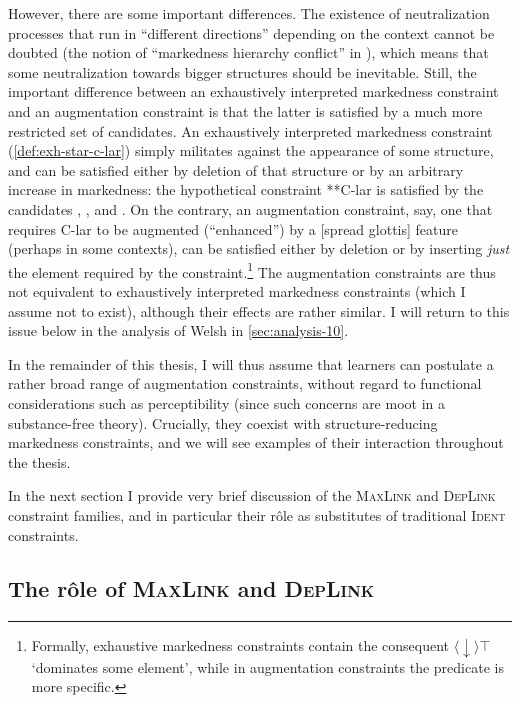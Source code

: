 However, there are some important differences. The existence of neutralization processes that run in \enquote{different directions} depending on the context cannot be doubted (\cf the notion of \enquote{markedness hierarchy conflict} in \citealp{delacy2006}), which means that some neutralization towards bigger structures should be inevitable. Still, the important difference between an exhaustively interpreted markedness constraint and an augmentation constraint is that the latter is satisfied by a much more restricted set of candidates. An exhaustively interpreted markedness constraint (\cref{def:exh-star-c-lar}) simply militates against the appearance of some structure, and can be satisfied either by deletion of that structure or by an arbitrary increase in markedness: the hypothetical constraint **C-lar is satisfied by the candidates \featurestring{\rt}, , and . On the contrary, an augmentation constraint, say, one that requires C-lar to be augmented (\enquote{enhanced}) by a [spread glottis] feature (perhaps in some contexts), can be satisfied either by deletion or by inserting \emph{just} the element required by the constraint.\footnote{Formally, exhaustive markedness constraints contain the consequent $\langle\downarrow\rangle\top$ `dominates some element', while in augmentation constraints the predicate is more specific.} The augmentation constraints are thus not equivalent to exhaustively interpreted markedness constraints (which I assume not to exist), although their effects are rather similar. I will return to this issue below in the analysis of Welsh in \cref{sec:analysis-10}.

In the remainder of this thesis, I will thus assume that learners can postulate a rather broad range of augmentation constraints, without regard to functional considerations such as perceptibility (since such concerns are moot in a substance\hyp free theory). Crucially, they coexist with structure\hyp reducing markedness constraints, and we will see examples of their interaction throughout the thesis.

In the next section I provide very brief discussion of the \textsc{MaxLink} and \textsc{DepLink} constraint families, and in particular their rôle as substitutes of traditional \textsc{Ident} constraints.

\subsection{The rôle of \textsc{MaxLink} and \textsc{DepLink}}
\label{sec:role-textscm-textscd}

